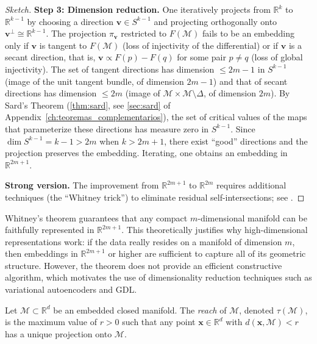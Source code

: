 \begin{proof}[Sketch]
\textbf{Step 3: Dimension reduction.}
One iteratively projects from $\mathbb{R}^k$ to $\mathbb{R}^{k-1}$ by choosing a direction $\mathbf{v} \in S^{k-1}$ and projecting orthogonally onto $\mathbf{v}^\perp \cong \mathbb{R}^{k-1}$. The projection $\pi_\mathbf{v}$ restricted to $F(\mathcal{M})$ fails to be an embedding only if $\mathbf{v}$ is tangent to $F(\mathcal{M})$ (loss of injectivity of the differential) or if $\mathbf{v}$ is a secant direction, that is, $\mathbf{v} \propto F(p) - F(q)$ for some pair $p \neq q$ (loss of global injectivity). The set of tangent directions has dimension $\leq 2m - 1$ in $S^{k-1}$ (image of the unit tangent bundle, of dimension $2m-1$) and that of secant directions has dimension $\leq 2m$ (image of $\mathcal{M} \times \mathcal{M} \setminus \Delta$, of dimension $2m$). By Sard's Theorem (\autoref{thm:sard}, see \autoref{sec:sard} of Appendix~\ref{ch:teoremas_complementarios}), the set of critical values of the maps that parameterize these directions has measure zero in $S^{k-1}$. Since $\dim S^{k-1} = k - 1 > 2m$ when $k > 2m + 1$, there exist ``good'' directions and the projection preserves the embedding. Iterating, one obtains an embedding in $\mathbb{R}^{2m+1}$.

\textbf{Strong version.}
The improvement from $\mathbb{R}^{2m+1}$ to $\mathbb{R}^{2m}$ requires additional techniques (the ``Whitney trick'') to eliminate residual self-intersections; see \citep[Chapter 6]{lee2012introduction}.
\end{proof}

Whitney's theorem guarantees that any compact $m$-dimensional manifold can be faithfully represented in $\mathbb{R}^{2m+1}$. This theoretically justifies why high-dimensional representations work: if the data really resides on a manifold of dimension $m$, then embeddings in $\mathbb{R}^{2m+1}$ or higher are sufficient to capture all of its geometric structure. However, the theorem does not provide an efficient constructive algorithm, which motivates the use of dimensionality reduction techniques such as variational autoencoders and \gls{GDL}.

\begin{definition}\label{def:reach}
Let $\mathcal{M} \subset \mathbb{R}^d$ be an embedded closed manifold. The \textit{reach} of $\mathcal{M}$, denoted $\tau(\mathcal{M})$, is the maximum value of $r > 0$ such that any point $\mathbf{x} \in \mathbb{R}^d$ with $d(\mathbf{x}, \mathcal{M}) < r$ has a unique projection onto $\mathcal{M}$.
\end{definition}

